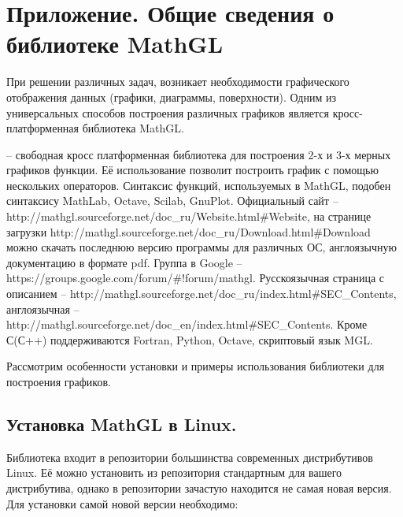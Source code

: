 \setcounter{tocdepth}{10}
\renewcommand\contentsname{Оглавление}
\tableofcontents
\section{}
\clearpage\section[Приложение. Общие сведения о библиотеке MathGL]{Приложение. Общие сведения о библиотеке MathGL}
При решении различных задач, возникает необходимости графического отображения данных (графики, диаграммы, поверхности).
Одним из универсальных способов построения различных графиков является кросс-платформенная библиотека MathGL.

 – свободная кросс платформенная библиотека для построения 2-х и 3-х
мерных графиков функции. Её использование позволит построить график с помощью нескольких операторов. Синтаксис функций,
используемых в MathGL, подобен синтаксису MathLab, Octave, Scilab, GnuPlot. Официальный сайт – 
http://mathgl.sourceforge.net/doc\_ru/Website.html\#Website, на странице загрузки
http://mathgl.sourceforge.net/doc\_ru/Download.html\#Download можно скачать последнюю версию программы для различных
ОС, англоязычную документацию в формате pdf. Группа в Google – https://groups.google.com/forum/\#!forum/mathgl.
Русскоязычная страница с описанием – http://mathgl.sourceforge.net/doc\_ru/index.html\#SEC\_Contents, англоязычная –
http://mathgl.sourceforge.net/doc\_en/index.html\#SEC\_Contents. Кроме С(С++) поддерживаются Fortran, Python, Octave,
скриптовый язык MGL.

Рассмотрим особенности установки и примеры использования библиотеки для построения графиков.

\subsection{Установка MathGL в Linux.}
Библиотека входит в репозитории большинства современных дистрибутивов Linux. Её можно установить из репозитория
стандартным для вашего дистрибутива, однако в репозитории зачастую находится не самая новая версия. Для установки самой
новой версии необходимо:


